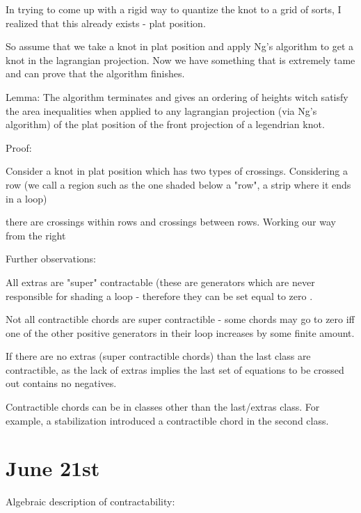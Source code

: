 \documentclass[11pt]{amsart}
\begin{document}
In trying to come up with a rigid way to quantize the knot to a grid of sorts, I realized that this already exists - plat position.

So assume that we take a knot in plat position and apply Ng's algorithm to get a knot in the lagrangian projection. Now we have something that is extremely tame and can prove that the algorithm finishes.



Lemma: The algorithm terminates and gives an ordering of heights witch satisfy the area inequalities when applied to any lagrangian projection (via Ng's algorithm) of the plat position of the front projection of a legendrian knot. 

Proof:

Consider a knot in plat position which has two types of crossings. Considering a row (we call a region such as the one shaded below a "row", a strip where it ends in a loop)



there are crossings within rows and crossings between rows. Working our way from the right






Further observations:

All extras are "super" contractable (these are generators which are never responsible for shading a loop - therefore they can  be set equal to zero .

Not all contractible chords are super contractible - some chords may go to zero iff one of the other positive generators in their loop increases by some finite amount. 


If there are no extras (super contractible chords) than the last class are contractible, as the lack of extras implies the last set of equations to be crossed out contains no negatives. 


Contractible chords can be in classes other than the last/extras class. For example, a stabilization introduced a contractible chord in the second class.









\section{June 21st}


Algebraic description of contractability:
\end{document}
